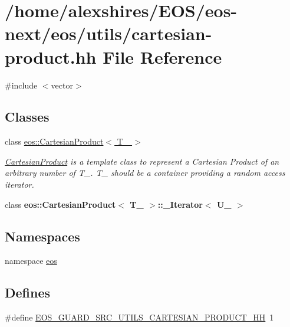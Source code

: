 \hypertarget{cartesian-product_8hh}{
\section{/home/alexshires/EOS/eos-\/next/eos/utils/cartesian-\/product.hh File Reference}
\label{cartesian-product_8hh}
}
{\ttfamily \#include $<$vector$>$}\par
\subsection*{Classes}
\begin{DoxyCompactItemize}
\item 
class \hyperlink{classeos_1_1CartesianProduct}{eos::CartesianProduct$<$ T\_\- $>$}
\begin{DoxyCompactList}\small\item\em \hyperlink{classeos_1_1CartesianProduct}{CartesianProduct} is a template class to represent a Cartesian Product of an arbitrary number of T\_\-. T\_\- should be a container providing a random access iterator. \item\end{DoxyCompactList}\item 
class {\bfseries eos::CartesianProduct$<$ T\_\- $>$::\_\-Iterator$<$ U\_\- $>$}
\end{DoxyCompactItemize}
\subsection*{Namespaces}
\begin{DoxyCompactItemize}
\item 
namespace \hyperlink{namespaceeos}{eos}
\end{DoxyCompactItemize}
\subsection*{Defines}
\begin{DoxyCompactItemize}
\item 
\#define \hyperlink{cartesian-product_8hh_a903a10839dae03fab1bdc91c3c42524f}{EOS\_\-GUARD\_\-SRC\_\-UTILS\_\-CARTESIAN\_\-PRODUCT\_\-HH}~1
\end{DoxyCompactItemize}


